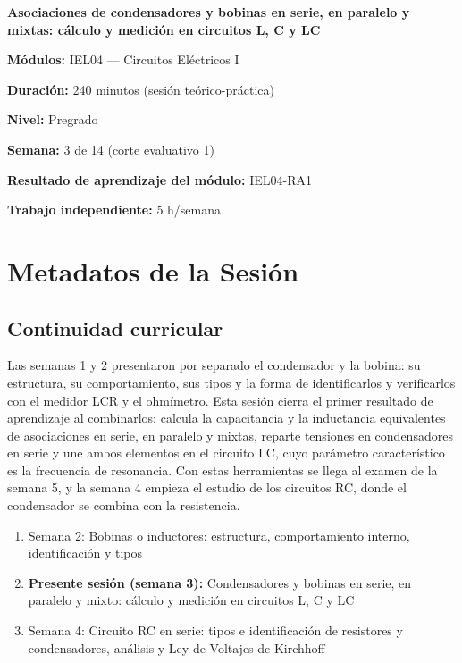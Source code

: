 \documentclass[11pt,letterpaper]{article}
\begin{document}
\begin{cabecera}
{\color{iubyellow}\Large\bfseries Asociaciones de condensadores y bobinas en serie, en paralelo y mixtas: cálculo y medición en circuitos L, C y LC\par}
\vspace{0.6em}
\small
\textbf{\color{iubyellow}Módulos:} IEL04 --- Circuitos Eléctricos I\par
\textbf{\color{iubyellow}Duración:} 240 minutos (sesión teórico-práctica)\par
\textbf{\color{iubyellow}Nivel:} Pregrado\par
\textbf{\color{iubyellow}Semana:} 3 de 14 (corte evaluativo 1)\par
\textbf{\color{iubyellow}Resultado de aprendizaje del módulo:} IEL04-RA1\par
\textbf{\color{iubyellow}Trabajo independiente:} 5 h/semana\par
\end{cabecera}

\section{Metadatos de la Sesión}

\subsection{Continuidad curricular}

Las semanas 1 y 2 presentaron por separado el condensador y la bobina: su estructura, su comportamiento, sus tipos y la forma de identificarlos y verificarlos con el medidor LCR y el ohmímetro. Esta sesión cierra el primer resultado de aprendizaje al combinarlos: calcula la capacitancia y la inductancia equivalentes de asociaciones en serie, en paralelo y mixtas, reparte tensiones en condensadores en serie y une ambos elementos en el circuito LC, cuyo parámetro característico es la frecuencia de resonancia. Con estas herramientas se llega al examen de la semana 5, y la semana 4 empieza el estudio de los circuitos RC, donde el condensador se combina con la resistencia.

\begin{enumerate}
  \item Semana 2: Bobinas o inductores: estructura, comportamiento interno, identificación y tipos
  \item \textbf{Presente sesión (semana 3):} Condensadores y bobinas en serie, en paralelo y mixto: cálculo y medición en circuitos L, C y LC
  \item Semana 4: Circuito RC en serie: tipos e identificación de resistores y condensadores, análisis y Ley de Voltajes de Kirchhoff
\end{enumerate}
\end{document}
